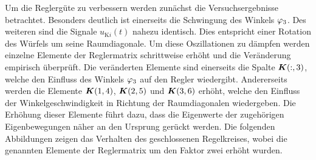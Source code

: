 Um die Reglergüte zu verbessern werden zunächst die Versuchsergebnisse betrachtet. Besonders deutlich ist einerseits die Schwingung des Winkels $\varphi_{\text{3}}$. Des weiteren sind die Signale $u_{\text{K}i}(t)$ nahezu identisch. Dies entspricht einer Rotation des Würfels um seine Raumdiagonale. Um diese Oszillationen zu dämpfen werden einzelne Elemente der Reglermatrix schrittweise erhöht und die Veränderung empirisch überprüft. Die veränderten Elemente sind einerseits die Spalte $\boldsymbol{K}(:,3)$, welche den Einfluss des Winkels $\varphi_{\text{3}}$ auf den Regler wiedergibt. Andererseits werden die Elemente $\boldsymbol{K}(1,4)$, $\boldsymbol{K}(2,5)$ und $\boldsymbol{K}(3,6)$ erhöht, welche den Einfluss der Winkelgeschwindigkeit in Richtung der Raumdiagonalen wiedergeben. Die Erhöhung dieser Elemente führt dazu, dass die Eigenwerte der zugehörigen Eigenbewegungen näher an den Ursprung gerückt werden. Die folgenden Abbildungen zeigen das Verhalten des geschlossenen Regelkreises, wobei die genannten Elemente der Reglermatrix um den Faktor zwei erhöht wurden.
